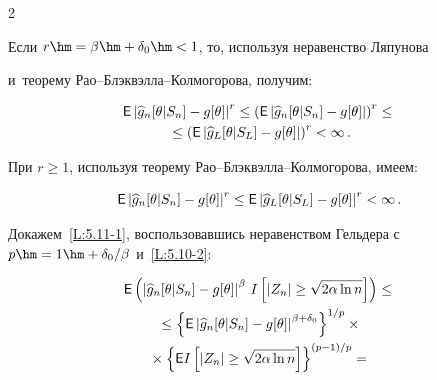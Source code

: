 \begin{multicols}{2}
 \Do


 Если $r\hm=\beta\hm+\delta_0\hm<1$, то, используя неравенство Ляпунова


 и~тео\-ре\-му Рао--Блэк\-вэл\-ла--Кол\-мо\-го\-ро\-ва, получим:


  \begin{multline*}


\Ep \left|\widehat{g}_n[\theta|S_n]-g[\theta] \right|^{r}\le


 \left(\Ep \left|\widehat{g}_n[\theta|S_n]-g[\theta] \right|\right)^{r}\le{}\\


 {}\le


 \left(\Ep \left|\widehat{g}_L[\theta|S_L]-g[\theta]


  \right|\right)^{r}<\infty\,.


 \end{multline*}


 При $r\ge 1$, используя теорему Рао--Блэк\-вэл\-ла--Кол\-мо\-го\-ро\-ва, имеем:


  \begin{equation*}


\Ep \left|\widehat{g}_n[\theta|S_n]-g[\theta] \right|^{r}\le


 \Ep \left|\widehat{g}_L[\theta|S_L]-g[\theta] \right|^{r}<\infty\,.


 \end{equation*}





 Докажем~\eqref{L:5.11-1}, воспользовавшись неравенством Гельдера с~$p\hm=1\hm+\delta_0/\beta$ и~\eqref{L:5.10-2}:


 \begin{multline*}


{\sf E} \left(\left|\widehat{g}_n[\theta|S_n]-g[\theta] \right|^{\beta}\,


 I\left[|Z_n|\ge \sqrt{2\alpha\ln n}\right]\right)\le{}


\\


{} \le


 \left\{{\sf E} \left|\widehat{g}_n[\theta|S_n]-g[\theta] \right|^{\beta+\delta_0}


 \right\}^{1/p}\times{}\\


 {}\times


 \left\{{\sf E} I\left[|Z_n|\ge \sqrt{2\alpha\ln n}\right]\right\}^{(p-1)/p}={}


\\



\end{multline*}
\end{multicols}
